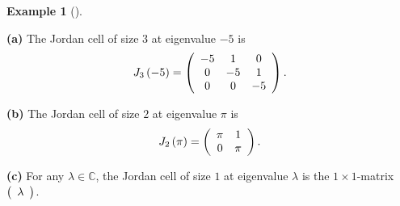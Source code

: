 \documentclass[numbers=enddot,12pt,final,onecolumn,notitlepage]{scrartcl}%
\numberwithin{exer}{subsection}
\theoremstyle{definition}
\newtheorem{exam}[theo]{Example}
\newenvironment{example}[1][]
{\begin{exam}[#1]\begin{leftbar}}
{\end{leftbar}\end{exam}}
\begin{document}
\begin{example}
\textbf{(a)} The Jordan cell of size $3$ at eigenvalue $-5$ is%
\[
J_{3}\left(  -5\right)  =\left(
\begin{array}
[c]{ccc}%
-5 & 1 & 0\\
0 & -5 & 1\\
0 & 0 & -5
\end{array}
\right)  .
\]


\textbf{(b)} The Jordan cell of size $2$ at eigenvalue $\pi$ is%
\[
J_{2}\left(  \pi\right)  =\left(
\begin{array}
[c]{cc}%
\pi & 1\\
0 & \pi
\end{array}
\right)  .
\]


\textbf{(c)} For any $\lambda\in\mathbb{C}$, the Jordan cell of size $1$ at
eigenvalue $\lambda$ is the $1\times1$-matrix $\left(
\begin{array}
[c]{c}%
\lambda
\end{array}
\right)  $.
\end{example}
\end{document}
